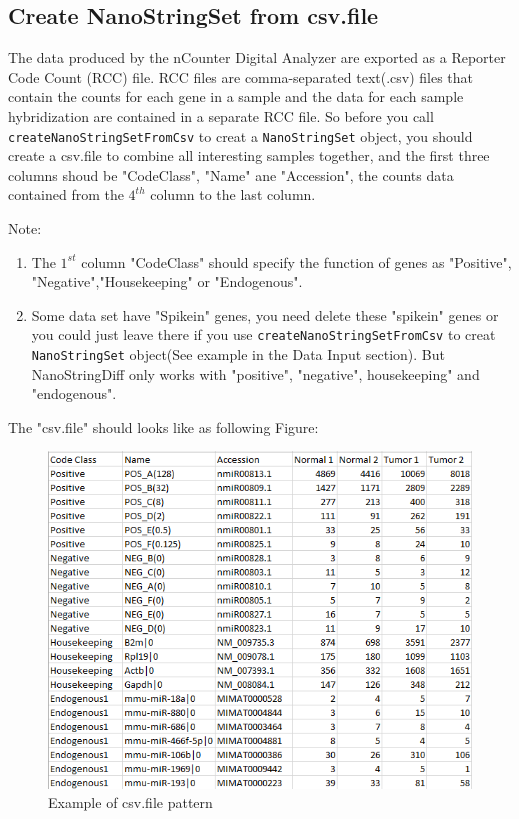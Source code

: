\documentclass[12pt]{article}
\begin{document}
\subsection{Create NanoStringSet from csv.file}
The data produced by the nCounter Digital Analyzer are exported as 
a Reporter  Code Count (RCC) file. RCC files are comma-separated 
text(.csv) files that contain the counts for each gene in a sample 
and the data for each sample hybridization are contained in a 
separate RCC file. So before you call {\tt createNanoStringSetFromCsv} 
to creat a {\tt NanoStringSet} object, you should create a csv.file 
to combine all interesting samples together, and the first three 
columns shoud be "CodeClass", "Name" ane "Accession", the counts 
data contained from the $4^{th}$ column to the last column.

Note:
\begin{enumerate}
\item The $1^{st}$ column "CodeClass" should specify the function 
of genes as "Positive", "Negative","Housekeeping" or "Endogenous".
\item Some data set have "Spikein" genes, you need delete these 
"spikein" genes or you could just leave there if you use 
{\tt createNanoStringSetFromCsv} to creat {\tt NanoStringSet} 
object(See example in the Data Input section). But NanoStringDiff 
only works with "positive", "negative", housekeeping" and "endogenous".
\end{enumerate}


The "csv.file" should looks like as following Figure:

\begin{figure}[ht]
  \centering
  \includegraphics{example.PNG}
  \caption{Example of csv.file pattern}
  \label{example}
\end{figure}
\end{document}
